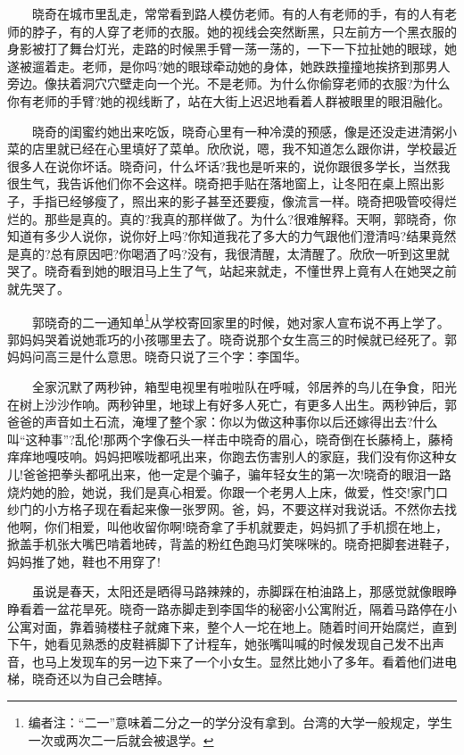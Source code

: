 \documentclass[12pt,UTF8]{ctexbook}
\begin{document}
　　晓奇在城市里乱走，常常看到路人模仿老师。有的人有老师的手，有的人有老师的脖子，有的人穿了老师的衣服。她的视线会突然断黑，只左前方一个黑衣服的身影被打了舞台灯光，走路的时候黑手臂一荡一荡的，一下一下拉扯她的眼球，她遂被遛着走。老师，是你吗?她的眼球牵动她的身体，她跌跌撞撞地挨挤到那男人旁边。像扶着洞穴穴壁走向一个光。不是老师。为什么你偷穿老师的衣服?为什么你有老师的手臂?她的视线断了，站在大街上迟迟地看着人群被眼里的眼泪融化。

　　晓奇的闺蜜约她出来吃饭，晓奇心里有一种冷漠的预感，像是还没走进清粥小菜的店里就已经在心里填好了菜单。欣欣说，嗯，我不知道怎么跟你讲，学校最近很多人在说你坏话。晓奇问，什么坏话?我也是听来的，说你跟很多学长，当然我很生气，我告诉他们你不会这样。晓奇把手贴在落地窗上，让冬阳在桌上照出影子，手指已经够瘦了，照出来的影子甚至还要瘦，像流言一样。晓奇把吸管咬得烂烂的。那些是真的。真的?我真的那样做了。为什么?很难解释。天啊，郭晓奇，你知道有多少人说你，说你好上吗?你知道我花了多大的力气跟他们澄清吗?结果竟然是真的?总有原因吧?你喝酒了吗?没有，我很清醒，太清醒了。欣欣一听到这里就哭了。晓奇看到她的眼泪马上生了气，站起来就走，不懂世界上竟有人在她哭之前就先哭了。

　　郭晓奇的二一通知单\footnote{编者注：\enquote{二一}意味着二分之一的学分没有拿到。台湾的大学一般规定，学生一次或两次二一后就会被退学。}从学校寄回家里的时候，她对家人宣布说不再上学了。郭妈妈哭着说她乖巧的小孩哪里去了。晓奇说那个女生高三的时候就已经死了。郭妈妈问高三是什么意思。晓奇只说了三个字：李国华。

　　全家沉默了两秒钟，箱型电视里有啦啦队在呼喊，邻居养的鸟儿在争食，阳光在树上沙沙作响。两秒钟里，地球上有好多人死亡，有更多人出生。两秒钟后，郭爸爸的声音如土石流，淹埋了整个家：你以为做这种事你以后还嫁得出去?什么叫\enquote{这种事}?乱伦!那两个字像石头一样击中晓奇的眉心，晓奇倒在长藤椅上，藤椅痒痒地嘎吱响。妈妈把喉咙都吼出来，你跑去伤害别人的家庭，我们没有你这种女儿!爸爸把拳头都吼出来，他一定是个骗子，骗年轻女生的第一次!晓奇的眼泪一路烧灼她的脸，她说，我们是真心相爱。你跟一个老男人上床，做爱，性交!家门口纱门的小方格子现在看起来像一张罗网。爸，妈，不要这样对我说话。不然你去找他啊，你们相爱，叫他收留你啊!晓奇拿了手机就要走，妈妈抓了手机掼在地上，掀盖手机张大嘴巴啃着地砖，背盖的粉红色跑马灯笑咪咪的。晓奇把脚套进鞋子，妈妈推了她，鞋也不用穿了!

　　虽说是春天，太阳还是晒得马路辣辣的，赤脚踩在柏油路上，那感觉就像眼睁睁看着一盆花旱死。晓奇一路赤脚走到李国华的秘密小公寓附近，隔着马路停在小公寓对面，靠着骑楼柱子就瘫下来，整个人一坨在地上。随着时间开始腐烂，直到下午，她看见熟悉的皮鞋裤脚下了计程车，她张嘴叫喊的时候发现自己发不出声音，也马上发现车的另一边下来了一个小女生。显然比她小了多年。看着他们进电梯，晓奇还以为自己会瞎掉。
\end{document}
